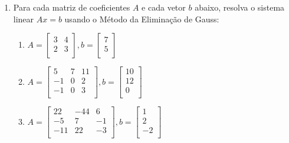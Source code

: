 \documentclass[a4paper]{article}
\begin{document}
\begin{enumerate}
\item Para cada matriz de coeficientes $A$ e cada vetor $b$ abaixo,
  resolva o sistema linear $Ax=b$ usando o Método da Eliminação de
  Gauss:
  \begin{enumerate}
  \item %
    $A = \begin{bmatrix}
        3 & 4\\
        2 & 3\\
      \end{bmatrix},
      b= \begin{bmatrix}
        7\\
        5\\
      \end{bmatrix}$

  \item %
    $A = \begin{bmatrix}
      5 & 7 & 11\\
      -1 & 0 & 2\\
      -1 & 0 & 3\\
      \end{bmatrix},
      b= \begin{bmatrix}
        10\\
        12\\
        0\\
      \end{bmatrix}$

  \item %
    $A = \begin{bmatrix}
      22 & -44 & 6\\
      -5 & 7 & -1\\
      -11 & 22 & -3\\
      \end{bmatrix},
      b= \begin{bmatrix}
        1\\
        2\\
        -2\\
      \end{bmatrix}$


\end{enumerate}
\end{enumerate}
\end{document}
